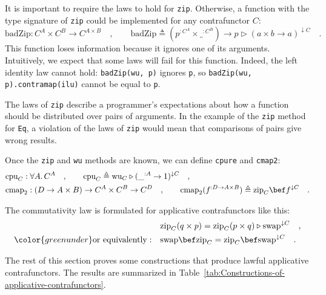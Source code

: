 It is important to require the laws to hold for \lstinline!zip!.
Otherwise, a function with the type signature of \lstinline!zip!
could be implemented for any contrafunctor $C$:
\[
\text{badZip}:C^{A}\times C^{B}\rightarrow C^{A\times B}\quad,\quad\quad\text{badZip}\triangleq(p^{:C^{A}}\times\_^{:C^{B}})\rightarrow p\triangleright(a\times b\rightarrow a)^{\downarrow C}\quad.
\]
This function loses information because it ignores one of its arguments.
Intuitively, we expect that some laws will fail for this function.
Indeed, the left identity law cannot hold: \lstinline!badZip(wu, p)!
ignores \lstinline!p!, so \lstinline!badZip(wu, p).contramap(ilu)!
cannot be equal to \lstinline!p!.

The laws of \lstinline!zip! describe a programmer\textsf{'}s expectations
about how a function should be distributed over pairs of arguments.
In the example of the \lstinline!zip! method for \lstinline!Eq!,
a violation of the laws of \lstinline!zip! would mean that comparisons
of pairs give wrong results.

Once the \lstinline!zip! and \lstinline!wu! methods are known, we
can define \lstinline!cpure! and \lstinline!cmap2!:
\begin{align*}
 & \text{cpu}_{C}:\forall A.\,C^{A}\quad,\quad\quad\text{cpu}_{C}\triangleq\text{wu}_{C}\triangleright(\_^{:A}\rightarrow1)^{\downarrow C}\quad,\\
 & \text{cmap}_{2}:(D\rightarrow A\times B)\rightarrow C^{A}\times C^{B}\rightarrow C^{D}\quad,\quad\quad\text{cmap}_{2}(f^{:D\rightarrow A\times B})\triangleq\text{zip}_{C}\bef f^{\downarrow C}\quad.
\end{align*}

The commutativity law is formulated for applicative contrafunctors
like this:
\begin{align*}
 & \text{zip}_{C}(q\times p)=\text{zip}_{C}(p\times q)\triangleright\text{swap}^{\downarrow C}\quad,\\
{\color{greenunder}\text{or equivalently}:}\quad & \text{swap}\bef\text{zip}_{C}=\text{zip}_{C}\bef\text{swap}^{\downarrow C}\quad.
\end{align*}

The rest of this section proves some constructions that produce lawful
applicative contrafunctors. The results are summarized in Table~\ref{tab:Constructions-of-applicative-contrafunctors}.

